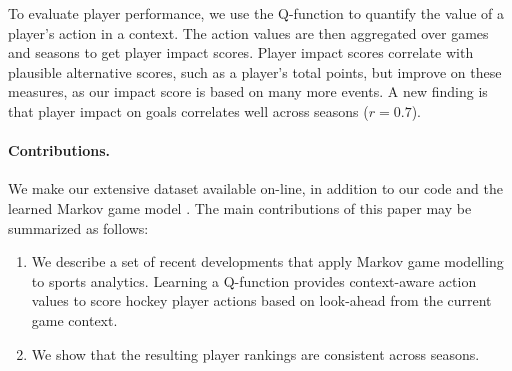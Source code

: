 \documentclass[runningheads,a4paper]{llncs}
\begin{document}
To evaluate player performance, we use the Q-function to quantify the value of a player's action in a context. The action values are then aggregated over games and seasons to get player impact scores. Player impact scores correlate with plausible alternative scores, such as a player's total points, but improve on these measures, as our impact score is based on many more events. A new finding is that player impact on goals correlates well across seasons ($r = 0.7$).

\paragraph{Contributions.}
We make our extensive dataset available on-line, in addition to our code and the learned Markov game model \cite{bib:sports-site}.
The main contributions of this paper may be summarized as follows:

\begin{enumerate}
\item We describe a set of recent developments that apply Markov game modelling to sports analytics. Learning a Q-function provides context-aware action values to score hockey player actions based on look-ahead from the current game context.
\item We show that the resulting player rankings are consistent across seasons.
\end{enumerate}
\end{document}
